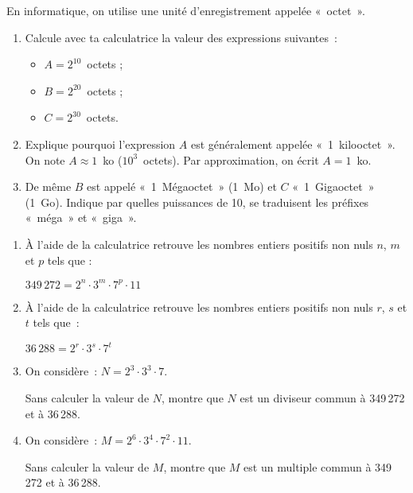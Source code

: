 \begin{exercice}
En informatique, on utilise une unité d'enregistrement appelée « octet ».
\begin{enumerate}
 \item Calcule avec ta calculatrice la valeur des expressions suivantes :
 \begin{itemize}
  \item $A = 2^{10}$ octets ;
  \item $B = 2^{20}$ octets ;
  \item $C = 2^{30}$ octets.
  \end{itemize}
 \item Explique pourquoi l'expression $A$ est généralement appelée « 1 kilooctet ». On note $A \approx 1$ ko ($10^3$ octets). Par approximation, on écrit $A = 1$ ko.
 \item De même $B$ est appelé « 1 Mégaoctet » (1 Mo) et $C$ « 1 Gigaoctet » (1 Go). Indique par quelles puissances de 10, se traduisent les préfixes « méga » et « giga ». 
 \end{enumerate}
\end{exercice}


\begin{exercice}
\begin{enumerate}
 \item À l'aide de la calculatrice retrouve les nombres entiers positifs non nuls $n$, $m$ et $p$ tels que :
 
 \begin{center} $349\,272 = 2^n \cdot 3^m \cdot 7^p \cdot 11$ \end{center}

 \item À l'aide de la calculatrice retrouve les nombres entiers positifs non nuls $r$, $s$ et $t$ tels que :
 
 \begin{center} $36\,288 = 2^r \cdot 3^s \cdot 7^t$ \end{center}
 
 \item On considère : $N = 2^3 \cdot 3^3 \cdot 7$.
 
Sans calculer la valeur de $N$, montre que $N$ est un diviseur commun à 349\,272 et à 36\,288.

 \item On considère : $M = 2^6 \cdot 3^4 \cdot 7^2 \cdot 11$.
 
Sans calculer la valeur de $M$, montre que $M$ est un multiple commun à 349\,272 et à 36\,288.
 \end{enumerate}
\end{exercice}


